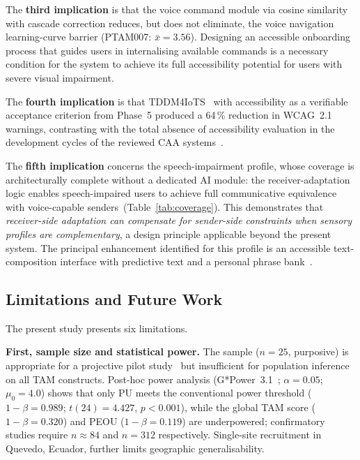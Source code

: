 \documentclass[journal]{IEEEtran}
\begin{document}
	The \textbf{third implication} is that the voice command module
	via cosine similarity with cascade correction reduces, but does
	not eliminate, the voice navigation learning-curve barrier
	(PTAM007: $\bar{x}{=}3.56$).
	Designing an accessible onboarding process that guides users
	in internalising available commands is a necessary condition
	for the system to achieve its full accessibility potential
	for users with severe visual impairment.
	
	The \textbf{fourth implication} is that TDDM4IoTS~\cite{guerrero2020}
	with accessibility as a verifiable acceptance criterion from Phase~5
	produced a 64\,\% reduction in WCAG~2.1 warnings, contrasting
	with the total absence of accessibility evaluation in the
	development cycles of the reviewed CAA
	systems~\cite{costanzo2023,mateos2022,janaka2023}.
	
	The \textbf{fifth implication} concerns the speech-impairment
	profile, whose coverage is architecturally complete without a
	dedicated AI module: the receiver-adaptation logic enables
	speech-impaired users to achieve full communicative equivalence
	with voice-capable senders~(Table~\ref{tab:coverage}).
	This demonstrates that \emph{receiver-side adaptation can compensate
		for sender-side constraints when sensory profiles are complementary},
	a design principle applicable beyond the present system.
	The principal enhancement identified for this profile is an
	accessible text-composition interface with predictive text and a
	personal phrase bank~\cite{elsahar2019,mateos2022}.
	
	\subsection{Limitations and Future Work}
	The present study presents six limitations.
	
	\textbf{First, sample size and statistical power.}
	The sample ($n{=}25$, purposive) is appropriate for a projective
	pilot study~\cite{hernandez2014} but insufficient for population
	inference on all TAM constructs.
	Post-hoc power analysis (G*Power~3.1~\cite{faul2007};
	$\alpha{=}0.05$; $\mu_0{=}4.0$) shows that only PU meets the
	conventional power threshold ($1{-}\beta{=}0.989$;
	$t(24){=}4.427$, $p{<}0.001$), while the global TAM score
	($1{-}\beta{=}0.320$) and PEOU ($1{-}\beta{=}0.119$) are
	underpowered; confirmatory studies require $n{\approx}84$ and
	$n{=}312$ respectively.
	Single-site recruitment in Quevedo, Ecuador, further limits
	geographic generalisability.
	
\end{document}
